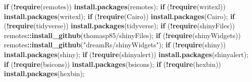 \documentclass[
]{book}
\newenvironment{Shaded}{\begin{snugshade}}{\end{snugshade}}
\newcommand{\ControlFlowTok}[1]{\textcolor[rgb]{0.13,0.29,0.53}{\textbf{#1}}}
\newcommand{\FunctionTok}[1]{\textcolor[rgb]{0.13,0.29,0.53}{\textbf{#1}}}
\newcommand{\NormalTok}[1]{#1}
\newcommand{\SpecialCharTok}[1]{\textcolor[rgb]{0.81,0.36,0.00}{\textbf{#1}}}
\newcommand{\StringTok}[1]{\textcolor[rgb]{0.31,0.60,0.02}{#1}}
\begin{document}
\begin{Shaded}
\begin{Highlighting}[]
\ControlFlowTok{if}\NormalTok{ (}\SpecialCharTok{!}\FunctionTok{require}\NormalTok{(}\StringTok{\textquotesingle{}remotes\textquotesingle{}}\NormalTok{)) }\FunctionTok{install.packages}\NormalTok{(}\StringTok{\textquotesingle{}remotes\textquotesingle{}}\NormalTok{);}
\ControlFlowTok{if}\NormalTok{ (}\SpecialCharTok{!}\FunctionTok{require}\NormalTok{(}\StringTok{\textquotesingle{}writexl\textquotesingle{}}\NormalTok{)) }\FunctionTok{install.packages}\NormalTok{(}\StringTok{\textquotesingle{}writexl\textquotesingle{}}\NormalTok{);}
\ControlFlowTok{if}\NormalTok{ (}\SpecialCharTok{!}\FunctionTok{require}\NormalTok{(}\StringTok{\textquotesingle{}Cairo\textquotesingle{}}\NormalTok{)) }\FunctionTok{install.packages}\NormalTok{(}\StringTok{\textquotesingle{}Cairo\textquotesingle{}}\NormalTok{);}
\ControlFlowTok{if}\NormalTok{ (}\SpecialCharTok{!}\FunctionTok{require}\NormalTok{(}\StringTok{\textquotesingle{}tidyverse\textquotesingle{}}\NormalTok{)) }\FunctionTok{install.packages}\NormalTok{(}\StringTok{\textquotesingle{}tidyverse\textquotesingle{}}\NormalTok{);}
\ControlFlowTok{if}\NormalTok{ (}\SpecialCharTok{!}\FunctionTok{require}\NormalTok{(}\StringTok{\textquotesingle{}shinyFiles\textquotesingle{}}\NormalTok{)) remotes}\SpecialCharTok{::}\FunctionTok{install\_github}\NormalTok{(}\StringTok{\textquotesingle{}thomasp85/shinyFiles\textquotesingle{}}\NormalTok{);}
\ControlFlowTok{if}\NormalTok{ (}\SpecialCharTok{!}\FunctionTok{require}\NormalTok{(}\StringTok{\textquotesingle{}shinyWidgets\textquotesingle{}}\NormalTok{)) remotes}\SpecialCharTok{::}\FunctionTok{install\_github}\NormalTok{(}\StringTok{"dreamRs/shinyWidgets"}\NormalTok{);}
\ControlFlowTok{if}\NormalTok{ (}\SpecialCharTok{!}\FunctionTok{require}\NormalTok{(}\StringTok{\textquotesingle{}shiny\textquotesingle{}}\NormalTok{)) }\FunctionTok{install.packages}\NormalTok{(}\StringTok{\textquotesingle{}shiny\textquotesingle{}}\NormalTok{);}
\ControlFlowTok{if}\NormalTok{ (}\SpecialCharTok{!}\FunctionTok{require}\NormalTok{(}\StringTok{\textquotesingle{}shinyalert\textquotesingle{}}\NormalTok{)) }\FunctionTok{install.packages}\NormalTok{(}\StringTok{\textquotesingle{}shinyalert\textquotesingle{}}\NormalTok{);}
\ControlFlowTok{if}\NormalTok{ (}\SpecialCharTok{!}\FunctionTok{require}\NormalTok{(}\StringTok{\textquotesingle{}bsicons\textquotesingle{}}\NormalTok{)) }\FunctionTok{install.packages}\NormalTok{(}\StringTok{\textquotesingle{}bsicons\textquotesingle{}}\NormalTok{);}
\ControlFlowTok{if}\NormalTok{ (}\SpecialCharTok{!}\FunctionTok{require}\NormalTok{(}\StringTok{\textquotesingle{}hexbin\textquotesingle{}}\NormalTok{)) }\FunctionTok{install.packages}\NormalTok{(}\StringTok{\textquotesingle{}hexbin\textquotesingle{}}\NormalTok{);}

\end{Highlighting}
\end{Shaded}
\end{document}
